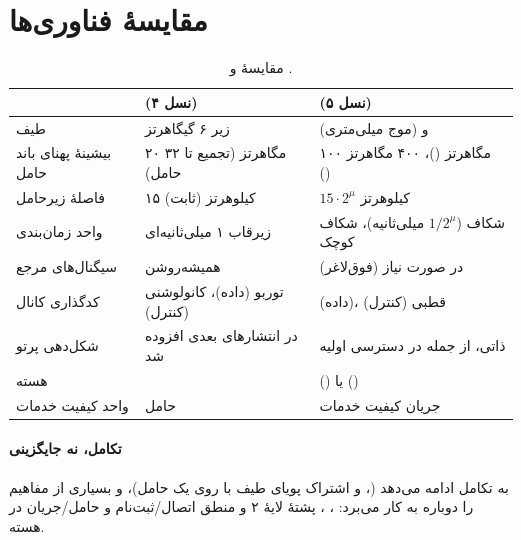 \documentclass[11pt,a4paper]{article}
\begin{document}
\section{مقایسهٔ فناوری‌ها}
\begin{table}[htbp]
\centering\small
\caption{مقایسهٔ  و .}\label{tab:cmp}
\begin{tabularx}{\linewidth}{@{}l Y Y@{}}
\toprule
{} &  (نسل ۴) &  (نسل ۵) \\
\midrule
طیف                 & زیر ۶ گیگاهرتز                  &  و  (موج میلی‌متری) \\
بیشینهٔ پهنای باند حامل & ۲۰ مگاهرتز (تجمیع تا ۳۲ حامل) & ۱۰۰ مگاهرتز ()، ۴۰۰ مگاهرتز () \\
فاصلهٔ زیرحامل       & ۱۵ کیلوهرتز (ثابت)               & $15\cdot2^\mu$ کیلوهرتز \\
واحد زمان‌بندی       & زیرقاب ۱ میلی‌ثانیه‌ای           & شکاف ($1/2^\mu$ میلی‌ثانیه)، شکاف کوچک \\
سیگنال‌های مرجع      &  همیشه‌روشن           & در صورت نیاز (فوق‌لاغر) \\
کدگذاری کانال        & توربو (داده)، کانولوشنی (کنترل)  &  (داده)، قطبی (کنترل) \\
شکل‌دهی پرتو         & در انتشارهای بعدی افزوده شد      & ذاتی، از جمله در دسترسی اولیه \\
هسته                 &                        &  () یا  () \\
واحد کیفیت خدمات     & حامل                    & جریان کیفیت خدمات \\
\bottomrule
\end{tabularx}
\end{table}

\paragraph{تکامل، نه جایگزینی}  به تکامل ادامه می‌دهد (،  و اشتراک پویای طیف با  روی
یک حامل)، و  بسیاری از مفاهیم  را دوباره به کار می‌برد: ، ، پشتهٔ لایهٔ ۲ و منطق
اتصال/ثبت‌نام و حامل/جریان در هسته.

\end{document}
